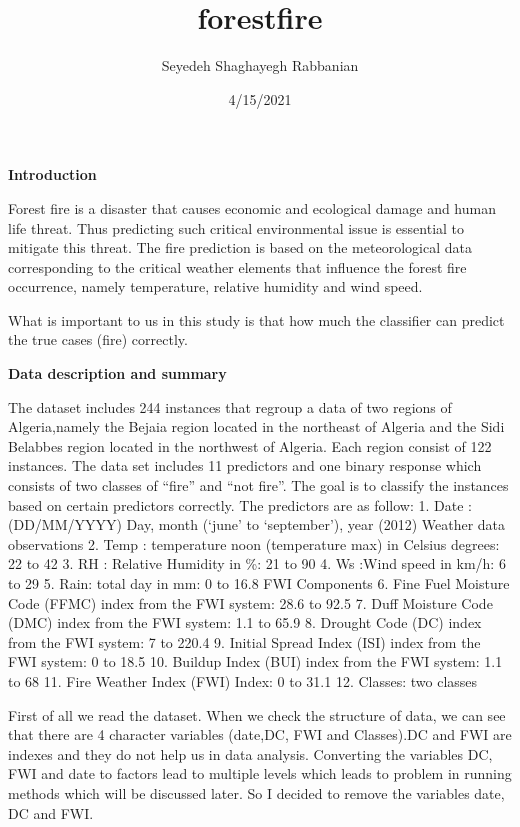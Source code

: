 \documentclass[
]{article}
\title{forestfire}
\author{Seyedeh Shaghayegh Rabbanian}
\date{4/15/2021}
\begin{document}
\maketitle

\textbf{Introduction}

Forest fire is a disaster that causes economic and ecological damage and
human life threat. Thus predicting such critical environmental issue is
essential to mitigate this threat. The fire prediction is based on the
meteorological data corresponding to the critical weather elements that
influence the forest fire occurrence, namely temperature, relative
humidity and wind speed.

What is important to us in this study is that how much the classifier
can predict the true cases (fire) correctly.

\textbf{Data description and summary}

The dataset includes 244 instances that regroup a data of two regions of
Algeria,namely the Bejaia region located in the northeast of Algeria and
the Sidi Belabbes region located in the northwest of Algeria. Each
region consist of 122 instances. The data set includes 11 predictors and
one binary response which consists of two classes of ``fire'' and ``not
fire''. The goal is to classify the instances based on certain
predictors correctly. The predictors are as follow: 1. Date :
(DD/MM/YYYY) Day, month (`june' to `september'), year (2012) Weather
data observations 2. Temp : temperature noon (temperature max) in
Celsius degrees: 22 to 42 3. RH : Relative Humidity in \%: 21 to 90 4.
Ws :Wind speed in km/h: 6 to 29 5. Rain: total day in mm: 0 to 16.8 FWI
Components 6. Fine Fuel Moisture Code (FFMC) index from the FWI system:
28.6 to 92.5 7. Duff Moisture Code (DMC) index from the FWI system: 1.1
to 65.9 8. Drought Code (DC) index from the FWI system: 7 to 220.4 9.
Initial Spread Index (ISI) index from the FWI system: 0 to 18.5 10.
Buildup Index (BUI) index from the FWI system: 1.1 to 68 11. Fire
Weather Index (FWI) Index: 0 to 31.1 12. Classes: two classes

First of all we read the dataset. When we check the structure of data,
we can see that there are 4 character variables (date,DC, FWI and
Classes).DC and FWI are indexes and they do not help us in data
analysis. Converting the variables DC, FWI and date to factors lead to
multiple levels which leads to problem in running methods which will be
discussed later. So I decided to remove the variables date, DC and FWI.
\end{document}
